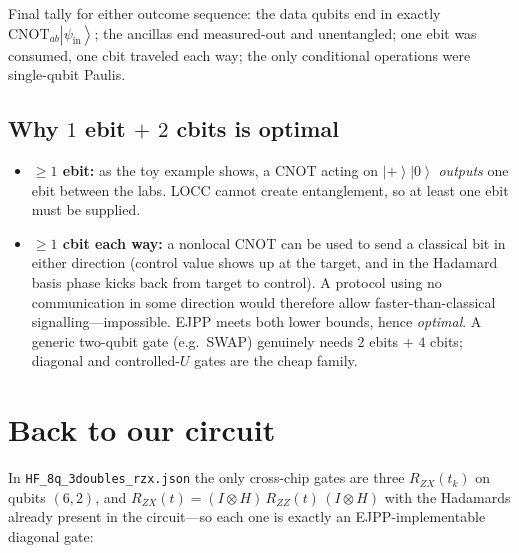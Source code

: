 \documentclass[11pt]{article}
\newcommand{\ket}[1]{\left|#1\right\rangle}
\newcommand{\RZZ}{R_{ZZ}}
\newcommand{\RZX}{R_{ZX}}
\begin{document}
Final tally for either outcome sequence: the data qubits end in exactly
$\mathrm{CNOT}_{ab}\ket{\psi_{\text{in}}}$; the ancillas end measured-out and
unentangled; one ebit was consumed, one cbit traveled each way; the only
conditional operations were single-qubit Paulis.

\subsection{Why $1$ ebit $+$ $2$ cbits is optimal}
\label{sec:optimal}

\begin{itemize}[leftmargin=2em]
  \item \textbf{$\geq 1$ ebit:} as the toy example shows, a CNOT acting on
        $\ket{+}\ket{0}$ \emph{outputs} one ebit between the labs. LOCC
        cannot create entanglement, so at least one ebit must be supplied.
  \item \textbf{$\geq 1$ cbit each way:} a nonlocal CNOT can be used to send
        a classical bit in either direction (control value shows up at the
        target, and in the Hadamard basis phase kicks back from target to
        control). A protocol using no communication in some direction would
        therefore allow faster-than-classical signalling---impossible. EJPP
        meets both lower bounds, hence \emph{optimal}. A generic two-qubit
        gate (e.g.\ SWAP) genuinely needs $2$ ebits $+$ $4$ cbits; diagonal
        and controlled-$U$ gates are the cheap family.
\end{itemize}

\section{Back to our circuit}

In \texttt{HF\_8q\_3doubles\_rzx.json} the only cross-chip gates are three
$\RZX(t_k)$ on qubits $(6,2)$, and
$\RZX(t) = (I \otimes H)\,\RZZ(t)\,(I \otimes H)$ with the Hadamards already
present in the circuit---so each one is exactly an EJPP-implementable
diagonal gate:
\end{document}
